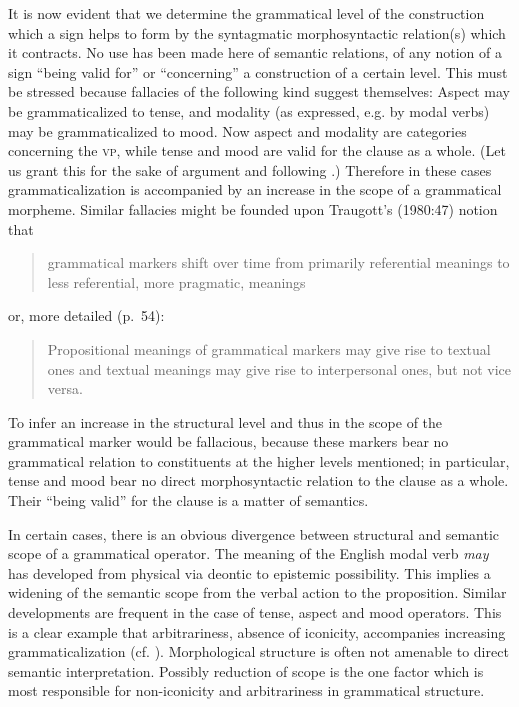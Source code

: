 It is now evident that we determine the grammatical level of the construction which a sign helps to form by the syntagmatic morphosyntactic relation(s) which it contracts. No use has been made here of semantic relations, of any notion of a sign “being valid for” or “concerning” a construction of a certain level. This must be stressed because fallacies of the following kind suggest themselves: Aspect may be grammaticalized to tense, and modality (as expressed, e.g. by modal verbs) may be grammaticalized to mood. Now aspect and modality are categories concerning the \textsc{vp}, while tense and mood are valid for the clause as a whole. (Let us grant this for the sake of argument and following \citet[7]{Bazell1949} .) Therefore in these cases grammaticalization is accompanied by an increase in the scope of a grammatical morpheme. Similar fallacies might be founded upon Traugott's (1980:47) notion that

\begin{quote}
grammatical markers shift over time from primarily referential meanings to less referential, more pragmatic, meanings
\end{quote}

or, more detailed (p.~54):

\begin{quote}
Propositional meanings of grammatical markers may give rise to textual ones and textual meanings may give rise to interpersonal ones, but not vice versa.
\end{quote}

To infer an increase in the structural level and thus in the scope of the grammatical marker would be fallacious, because these markers bear no grammatical relation to constituents at the higher levels mentioned; in particular, tense and mood bear no direct morphosyntactic relation to the clause as a whole. Their “being valid” for the clause is a matter of semantics.

In certain cases, there is an obvious divergence between structural and semantic scope of a grammatical operator. The meaning of the English modal verb \textit{may} has developed from physical via deontic to epistemic possibility. This implies a widening of the semantic scope from the verbal action to the proposition. Similar developments are frequent in the case of tense, aspect and mood operators. This is a clear example that arbitrariness, absence of iconicity, accompanies increasing grammaticalization (cf. ). Morphological structure is often not amenable to direct semantic interpretation. Possibly reduction of scope is the one factor which is most responsible for non-iconicity and arbitrariness in grammatical structure.

